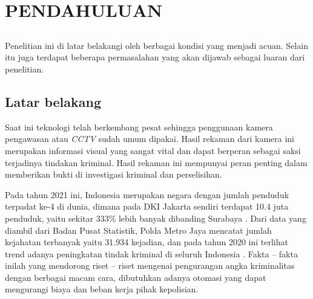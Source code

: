 \chapter{PENDAHULUAN}
\vspace{1ex}

\section*{}
Penelitian ini di latar belakangi oleh berbagai kondisi yang menjadi acuan. Selain itu juga terdapat beberapa permasalahan yang akan dijawab sebagai luaran dari penelitian.
\vspace{1ex}

\section{Latar belakang}
\vspace{1ex}

Saat ini teknologi telah berkembang pesat sehingga penggunaan kamera pengawasan atau \textit{CCTV} sudah umum dipakai. Hasil rekaman dari kamera ini  merupakan informasi visual yang sangat vital dan dapat berperan sebagai saksi terjadinya tindakan kriminal. Hasil rekaman ini mempunyai peran penting dalam memberikan bukti di investigasi kriminal dan perselisihan.  
\vspace{1ex}

Pada tahun 2021 ini, Indonesia merupakan negara dengan jumlah penduduk terpadat ke-4 di dunia, dimana pada DKI Jakarta sendiri terdapat 10.4 juta penduduk, yaitu sekitar 333\% lebih banyak dibanding Surabaya \cite{cit:1, cit:2}. Dari data yang diambil dari Badan Pusat Statistik, Polda Metro Jaya mencatat jumlah kejahatan terbanyak yaitu 31.934 kejadian, dan pada tahun 2020 ini terlihat trend adanya peningkatan tindak kriminal di seluruh Indonesia \cite{cit:3, cit:4, cit:5, cit:6}. Fakta – fakta inilah yang mendorong riset – riset mengenai pengurangan angka kriminalitas dengan berbagai macam cara, dibutuhkan adanya otomasi yang dapat mengurangi biaya dan beban kerja pihak kepolisian.
\vspace{1ex} 
 
